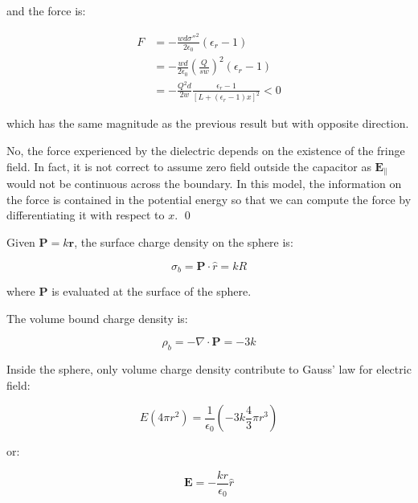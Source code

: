 \documentclass[12pt]{article}
\begin{document}
and the force is:

\begin{equation}
\begin{split}
    F &= -\frac{wd\sigma''^{2}}{2\epsilon_{0}} (\epsilon_{r} - 1) \\
    &= -\frac{wd}{2\epsilon_{0}} \left( \frac{Q}{sw} \right)^{2} (\epsilon_{r} - 1) \\
    &= -\frac{Q^{2}d}{2w} \frac{\epsilon_{r} - 1}{[L + (\epsilon_{r} - 1)x]^{2}} < 0
\end{split}
\end{equation}

which has the same magnitude as the previous result but with opposite direction.

No, the force experienced by the dielectric depends on the existence of the fringe field. In fact, it is not correct to assume zero field outside the capacitor as $\mathbf{E}_{\parallel}$ would not be continuous across the boundary. In this model, the information on the force is contained in the potential energy so that we can compute the force by differentiating it with respect to $x$.
\qed



Given $\mathbf{P} = k \mathbf{r}$, the surface charge density on the sphere is:

\begin{equation}
    \sigma_{b} = \mathbf{P} \cdot \hat{r} = kR
\end{equation}

where $\mathbf{P}$ is evaluated at the surface of the sphere. 

The volume bound charge density is:

\begin{equation}
    \rho_{b} = -\nabla \cdot \mathbf{P} = -3k
\end{equation}

Inside the sphere, only volume charge density contribute to Gauss' law for electric field:

\begin{equation}
    E (4\pi r^{2}) = \frac{1}{\epsilon_{0}} \left( -3k \frac{4}{3} \pi r^{3} \right)
\end{equation}

or:

\begin{equation}
    \mathbf{E} = -\frac{kr}{\epsilon_{0}} \hat{r}
\end{equation}
\end{document}
